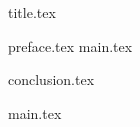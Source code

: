 



{title.tex}

\clearpage
\setcounter{page}{2}

\tableofcontents
\thispagestyle{empty}

\clearpage
\pagestyle{fancy}

\clearpage

{preface.tex}
{main.tex}

{conclusion.tex}

\clearpage

\renewcommand\bibname{Перелік посилань}


{main.tex}


